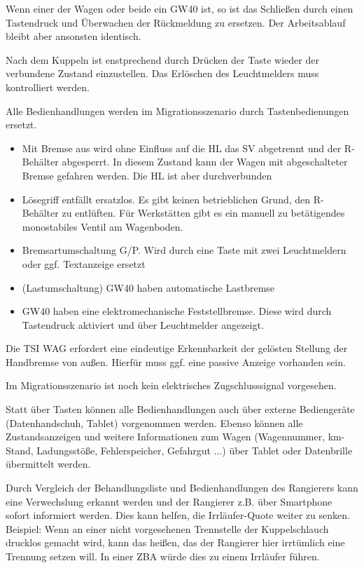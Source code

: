 Wenn einer der Wagen oder beide ein GW40 ist, so ist das Schließen durch einen Tastendruck und Überwachen der Rückmeldung zu ersetzen. Der Arbeitsablauf bleibt aber ansonsten identisch.\par
Nach dem Kuppeln ist enstprechend durch Drücken der Taste wieder der verbundene Zustand einzustellen. Das Erlöschen des  Leuchtmelders muss kontrolliert werden.\par
Alle Bedienhandlungen werden im Migrationsszenario durch Tastenbedienungen ersetzt.
\begin{itemize}
\item Mit Bremse aus wird ohne Einfluss auf die HL das SV abgetrennt und der R-Behälter abgesperrt. In diesem Zustand kann der Wagen mit abgeschalteter Bremse gefahren werden. Die HL ist aber durchverbunden
\item Lösegriff entfällt ersatzlos. Es gibt keinen betrieblichen Grund, den R-Behälter zu entlüften. Für Werkstätten gibt es ein manuell zu betätigendes monostabiles Ventil am Wagenboden. 
\item Bremsartumschaltung G/P. Wird durch eine Taste mit zwei Leuchtmeldern oder ggf. Textanzeige ersetzt
\item (Lastumschaltung) GW40 haben automatische Lastbremse
\item GW40 haben eine elektromechanische Feststellbremse. Diese wird durch Tastendruck aktiviert und über Leuchtmelder angezeigt.
\end{itemize} 
Die TSI WAG erfordert eine eindeutige Erkennbarkeit der gelösten Stellung der Handbremse von außen. Hierfür muss ggf. eine passive Anzeige vorhanden sein.\par
Im Migrationsszenario ist noch kein elektrisches Zugschlusssignal vorgesehen.\par
Statt über Tasten können alle Bedienhandlungen auch über externe Bediengeräte (Datenhandschuh, Tablet) vorgenommen werden. Ebenso können alle Zustandsanzeigen und weitere Informationen zum Wagen (Wagennummer, km-Stand, Ladungsstöße, Fehlerspeicher, Gefahrgut ...) über Tablet oder Datenbrille übermittelt werden.\par
Durch Vergleich der Behandlungsliste und Bedienhandlungen des Rangierers kann eine Verwechslung erkannt werden und der Rangierer  z.B. über Smartphone sofort informiert werden. Dies kann helfen, die Irrläufer-Quote weiter zu senken. Beispiel: Wenn an einer nicht vorgesehenen Trennstelle der Kuppelschlauch drucklos gemacht wird, kann das heißen, das der Rangierer hier irrtümlich eine Trennung setzen will. In einer ZBA würde dies zu einem Irrläufer führen.\par
